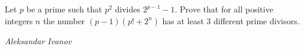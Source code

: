 Let $p$ be a prime such that $p^2$ divides $2^{p-1}-1$. Prove that for all positive integers $n$ the number $\left(p-1\right)\left(p!+2^n\right)$ has at least $3$ different prime divisors.

\textit{Aleksandar Ivanov}